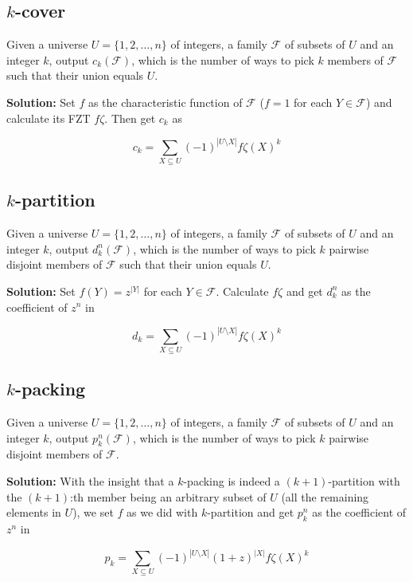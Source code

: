 \documentclass[a4paper, titlepage]{article}
\begin{document}
\subsection{$k$-cover}
Given a universe $U = \{1, 2, \ldots, n\}$ of integers, a family $\mathcal{F}$ of subsets of $U$ and an integer $k$, output $c_k(\mathcal{F})$, which is the number of ways to pick $k$ members of $\mathcal{F}$ such that their union equals $U$.

\textbf{Solution:} Set $f$ as the characteristic function of $\mathcal{F}$ ($f = 1$ for each $Y \in \mathcal{F}$) and calculate its FZT $f\zeta$. Then get $c_k$ as

$$
c_k = \sum_{X\subseteq U} (-1)^{|U \setminus X|}f\zeta(X)^k
$$

\subsection{$k$-partition}
Given a universe $U = \{1, 2, \ldots, n\}$ of integers, a family $\mathcal{F}$ of subsets of $U$ and an integer $k$, output $d_k^n(\mathcal{F})$, which is the number of ways to pick $k$ pairwise disjoint members of $\mathcal{F}$ such that their union equals $U$.

\textbf{Solution:} Set $f(Y) = z^{|Y|}$ for each $Y \in \mathcal{F}$. Calculate $f\zeta$ and get $d_k^n$ as the coefficient of $z^n$ in

$$
d_k = \sum_{X\subseteq U} (-1)^{|U \setminus X|}f\zeta(X)^k
$$

\subsection{$k$-packing}
Given a universe $U = \{1, 2, \ldots, n\}$ of integers, a family $\mathcal{F}$ of subsets of $U$ and an integer $k$, output $p_k^n(\mathcal{F})$, which is the number of ways to pick $k$ pairwise disjoint members of $\mathcal{F}$.

\textbf{Solution:} With the insight that a $k$-packing is indeed a $(k+1)$-partition with the $(k+1)$:th member being an arbitrary subset of $U$ (all the remaining elements in $U$), we set $f$ as we did with $k$-partition and get $p_k^n$ as the coefficient of $z^n$ in

$$
p_k = \sum_{X\subseteq U} (-1)^{|U \setminus X|} (1+z)^{|X|} f\zeta(X)^k
$$

\end{document}
